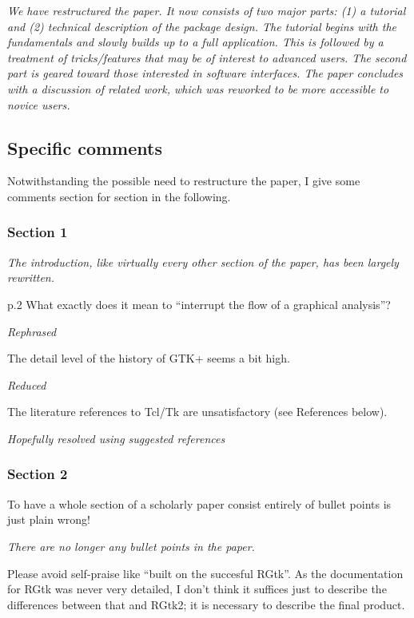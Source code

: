 \documentclass{article}
\begin{document}
\emph{We have restructured the paper. It now consists of two major parts: 
(1) a tutorial and (2) technical description of the package design. The tutorial
begins with the fundamentals and slowly builds up to a full application. This 
is followed by a treatment of tricks/features that may be of interest to
advanced users. The second part is geared toward those interested in software
interfaces. The paper concludes with a discussion of related work, which was 
reworked to be more accessible to novice users.}

\subsection*{Specific comments}

Notwithstanding the possible need to restructure the paper, I give some comments
section for section in the following.

\subsubsection*{Section 1}

\emph{The introduction, like virtually every other section of the paper, has
been largely rewritten.}

p.2 What exactly does it mean to ``interrupt the flow of a graphical analysis''?

\emph{Rephrased}

The detail level of the history of GTK+ seems a bit high.

\emph{Reduced}

The literature references to Tcl/Tk are unsatisfactory (see References below).

\emph{Hopefully resolved using suggested references}

\subsubsection*{Section 2}

To have a whole section of a scholarly paper consist entirely of bullet points is
just plain wrong!

\emph{There are no longer any bullet points in the paper.}

Please avoid self-praise like ``built on the succesful RGtk''.
As the documentation for RGtk was never very detailed, I don't think it suffices
just to describe the differences between that and RGtk2; it is necessary to describe
the final product. 
\end{document}
